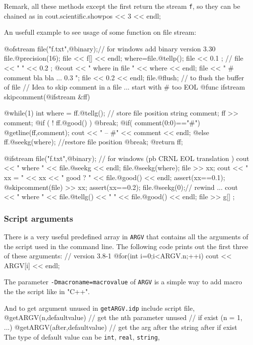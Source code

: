 \documentclass[a4paper,twoside,12pt]{book}
\def\n{\nabla}
\def\setS#1{#1\label{sec:#1}}
\begin{document}
\begin{example}
Remark, all these methods except the first return the stream \texttt{f}, so they can be chained as in
\bFF
    cout.scientific.showpos << 3 << endl;
\eFF

An usefull example to see usage of some  function on file stream: 

\bFF
{ 
  @ofstream file("f.txt",@binary);// for windows add binary version 3.30 
  file.@precision(16);
  file << f[] << endl;
  where=file.@tellp();
  file << 0.1 ;
  //  file << " " << 0.2 ;
  @cout << " where in file " << where << endl;
  file << " # comment bla bla ...  0.3 \n";
  file << 0.2 << endl; 
  file.@flush; // to flush the buffer of file
}
//  Idea to skip comment in a file ...  start with  # too EOL
@func ifstream skipcomment(@ifstream &ff)
{
    
    @while(1)
    {
    int where = ff.@tellg(); // store file position 
    string comment;
    ff >> comment; 
    @if ( ! ff.@good() ) @break; 
    @if( comment(0:0)=="#") {
         @getline(ff,comment);
         cout << " -- #" << comment << endl;
    }
    @else {
        ff.@seekg(where); //restore file position 
        @break;        
    }    
    }
    @return ff;
}
{
  @ifstream file("f.txt",@binary); // for windows (pb CRNL EOL  translation ) 
  cout << " where " << file.@seekg << endl; 
  file.@seekg(where);
  file >> xx;
  cout <<  " xx = " << xx << " good ? " << file.@good() << endl;
  assert(xx==0.1);
  @skipcomment(file) >> xx;
  assert(xx==0.2);
  file.@seekg(0);//  rewind ...
  cout << " where " << file.@tellg() << " " << file.@good() << endl; 
  file >> g[] ;
}
\eFF

\subsubsection{\setS{Script arguments}}
There is a very useful predefined array in \freefempp \texttt{ARGV} that contains all the arguments of the script used in the command line. The following code prints out the first three of these arguments: 
\bFF
//  version 3.8-1
@for(int i=0;i<ARGV.n;++i)
  {
    cout << ARGV[i] << endl;
  }
\eFF
\end{example}

The parameter    \texttt{-Dmacroname=macrovalue}  of \texttt{ARGV} is a simple way to add macro the the script like in "C++". 

And to get argument unused in \texttt{getARGV.idp} include script file, 
\bFF
@getARGV(n,defaultvalue) // get the nth parameter unused 
// if exist (n = 1, ...)
@getARGV(after,defaultvalue) // get the arg after the string after if exist
\eFF
The type of default value can be \texttt{int}, \texttt{real}, \texttt{string},
\end{document}
